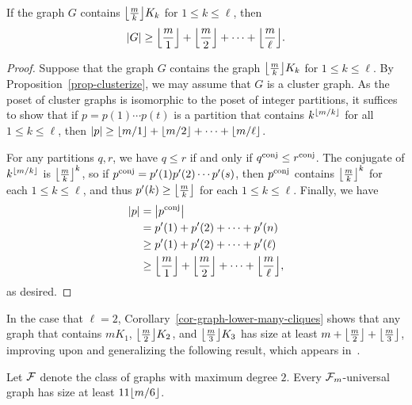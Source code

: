 \begin{corollary}
	\label{cor-graph-lower-many-cliques}
	If the graph $G$ contains ${\left\lfloor{\frac{m}{k}}\right\rfloor} K_{k}$ for $1 \le k \le \ell$, then
	\[
		\left\lvert{G}\right\rvert
		\ge
		{\left\lfloor{\dfrac{m}{1}}\right\rfloor} + {\left\lfloor{\dfrac{m}{2}}\right\rfloor} + \cdots + {\left\lfloor{\dfrac{m}{\ell}}\right\rfloor}.
	\]
\end{corollary}
\begin{proof}
	Suppose that the graph $G$ contains the graph ${\left\lfloor{\frac{m}{k}}\right\rfloor} K_{k}$ for $1 \le k \le \ell$. By Proposition~\ref{prop-clusterize}, we may assume that $G$ is a cluster graph. As the poset of cluster graphs is isomorphic to the poset of integer partitions, it suffices to show that if $p = p(1) \cdots p(t)$ is a partition that contains $k^{{\left\lfloor{m/k}\right\rfloor}}$ for all $1 \le k \le \ell$, then $\left\lvert{p}\right\rvert \ge {\left\lfloor{m/1}\right\rfloor} + {\left\lfloor{m/2}\right\rfloor} + \cdots + {\left\lfloor{m/\ell}\right\rfloor}$. 

	For any partitions $q, r$, we have $q \le r$ if and only if $q^{\operatorname{conj}} \le r^{\operatorname{conj}}$. The conjugate of $k^{{\left\lfloor{m/k}\right\rfloor}}$ is ${\left\lfloor{\frac{m}{k}}\right\rfloor}^k$, so if $p^{\operatorname{conj}} = p'(1) p'(2) \cdots p'(s)$, then $p^{\operatorname{conj}}$ contains ${\left\lfloor{\frac{m}{k}}\right\rfloor}^k$ for each $1 \le k \le \ell$, and thus $p'(k) \ge {\left\lfloor{\frac{m}{k}}\right\rfloor}$ for each $1 \le k \le \ell$. Finally, we have
	\begin{align*}
		\left\lvert{p}\right\rvert
			&= \left\lvert{p^{ \operatorname{conj}}}\right\rvert \\
			&= p'(1) + p'(2) + \cdots + p'(n) \\
			&\ge p'(1) + p'(2) + \cdots + p'(\ell) \\
			&\ge {\left\lfloor{\dfrac{m}{1}}\right\rfloor} + {\left\lfloor{\dfrac{m}{2}}\right\rfloor} + \cdots + {\left\lfloor{\dfrac{m}{\ell}}\right\rfloor},
	\end{align*}
	as desired.
\end{proof}

In the case that $\ell = 2$, Corollary~\ref{cor-graph-lower-many-cliques} shows that any graph that contains $m K_1$, ${\left\lfloor{\frac{m}{2}}\right\rfloor} K_2$, and ${\left\lfloor{\frac{m}{3}}\right\rfloor} K_3$ has size at least $m + {\left\lfloor{\frac{m}{2}}\right\rfloor} + {\left\lfloor{\frac{m}{3}}\right\rfloor}$, improving upon and generalizing the following result, which appears in~\cite{esperet:on-induced-universal:}.

\begin{claim}
\label{claim-max-degree-2}
	Let $\mathcal{F}$ denote the class of graphs with maximum degree $2$. Every $\mathcal{F}_m$-universal graph has size at least $11{\left\lfloor{m/6}\right\rfloor}$.
\end{claim}


